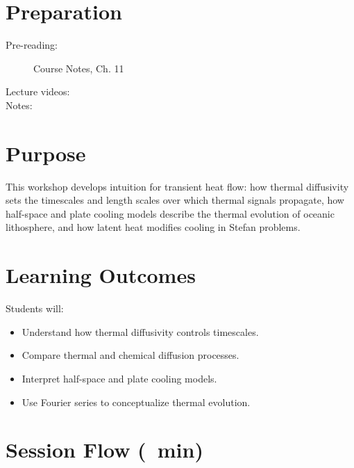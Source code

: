 
\workshopstart

\vspace{-0.75em}
\section*{Preparation}

\begin{description}
  \item[Pre-reading:] Course Notes, Ch. 11
  \item[Lecture videos:]
  \item[Notes:]
\end{description}

\section*{Purpose}

This workshop develops intuition for transient heat flow: how thermal diffusivity sets the timescales and length scales over which thermal signals propagate, how half-space and plate cooling models describe the thermal evolution of oceanic lithosphere, and how latent heat modifies cooling in Stefan problems.

\section*{Learning Outcomes}
Students will:
\begin{itemize}
  \item Understand how thermal diffusivity controls timescales.
  \item Compare thermal and chemical diffusion processes.
  \item Interpret half-space and plate cooling models.
  \item Use Fourier series to conceptualize thermal evolution.
\end{itemize}

\section*{Session Flow (\timelinelength\ min)}



